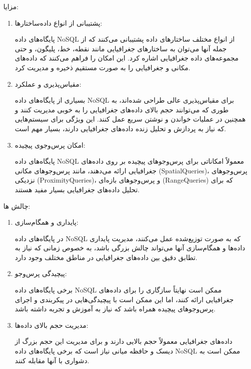 مزایا:
\begin{enumerate}
\item  پشتیبانی از انواع داده‌ساختارها:
	
	پایگاه‌های داده NoSQL از انواع مختلف ساختارهای داده پشتیبانی می‌کنند که از جمله آنها می‌توان به ساختارهای جغرافیایی مانند نقطه، خط، پلیگون، و حتی مجموعه‌های داده جغرافیایی اشاره کرد. این امکان را فراهم می‌کنند که داده‌های مکانی و جغرافیایی را به صورت مستقیم ذخیره و مدیریت کرد.
	\item  مقیاس‌پذیری و عملکرد:
	
	بسیاری از پایگاه‌های داده NoSQL برای مقیاس‌پذیری عالی طراحی شده‌اند، به طوری که می‌توانند حجم بالای داده‌های جغرافیایی را به خوبی مدیریت کنند و همچنین در عملیات خواندن و نوشتن سریع عمل کنند. این ویژگی برای سیستم‌هایی که نیاز به پردازش و تحلیل زنده داده‌های جغرافیایی دارند، بسیار مهم است.
	\item  امکان پرس‌وجوی پیچیده:
	
	پایگاه‌های داده NoSQL معمولاً امکاناتی برای پرس‌وجوهای پیچیده بر روی داده‌های جغرافیایی ارائه می‌دهند، مانند پرس‌وجوهای مکانی (SpatialQueries)، پرس‌وجوهای نزدیکی (ProximityQueries)، و پرس‌وجوهای بازه‌ای (RangeQueries) که برای تحلیل داده‌های جغرافیایی بسیار مفید هستند.
\end{enumerate}


چالش ها:

\begin{enumerate}
	\item پایداری و همگام‌سازی:
	
	در پایگاه‌های داده NoSQL که به صورت توزیع‌شده عمل می‌کنند، مدیریت پایداری داده‌ها و همگام‌سازی آنها می‌تواند چالش بزرگی باشد، به خصوص زمانی که نیاز به تطابق دقیق بین داده‌های جغرافیایی در مناطق مختلف وجود دارد.
	\item پیچیدگی پرس‌وجو:
	
	برخی پایگاه‌های داده NoSQL ممکن است نهایتاً سازگاری را برای داده‌های جغرافیایی ارائه کنند، اما این ممکن است با پیچیدگی‌هایی در پیکربندی و اجرای پرس‌وجوهای پیچیده همراه باشد که نیاز به آموزش و تجربه داشته باشد.
	\item مدیریت حجم بالای داده‌ها:
	
	داده‌های جغرافیایی معمولاً حجم بالایی دارند و برای مدیریت این حجم بزرگ از دیسک و حافظه میانی نیاز است که برخی پایگاه‌های داده NoSQL ممکن است به دشواری با آنها مقابله کنند.
\end{enumerate}